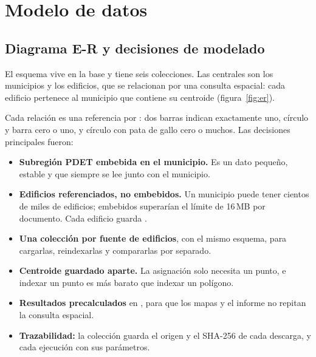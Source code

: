 \section{Modelo de datos}
\label{sec:modelo}

\subsection{Diagrama E-R y decisiones de modelado}

El esquema vive en la base  y tiene seis colecciones. Las
centrales son los municipios y los edificios, que se relacionan por una
consulta espacial: cada edificio pertenece al municipio que contiene su
centroide (figura~\ref{fig:er}).


Cada relación es una referencia por : dos barras indican
exactamente uno, círculo y barra cero o uno, y círculo con pata de gallo cero
o muchos. Las decisiones principales fueron:

\begin{itemize}
  \item \textbf{Subregión PDET embebida en el municipio.} Es un dato pequeño,
        estable y que siempre se lee junto con el municipio.
  \item \textbf{Edificios referenciados, no embebidos.} Un municipio puede
        tener cientos de miles de edificios; embebidos superarían el límite de
        16\,MB por documento. Cada edificio guarda .
  \item \textbf{Una colección por fuente de edificios}, con el mismo esquema,
        para cargarlas, reindexarlas y compararlas por separado.
  \item \textbf{Centroide guardado aparte.} La asignación solo necesita un
        punto, e indexar un punto es más barato que indexar un polígono.
  \item \textbf{Resultados precalculados} en , para que los
        mapas y el informe no repitan la consulta espacial.
  \item \textbf{Trazabilidad:} la colección  guarda el origen y el
        SHA-256 de cada descarga, y  cada ejecución
        con sus parámetros.
\end{itemize}

